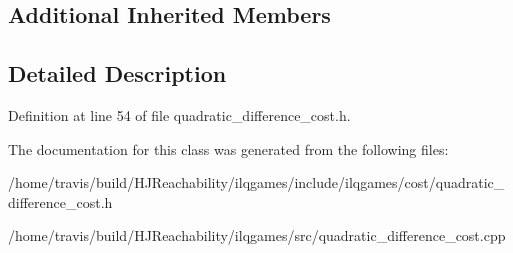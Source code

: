 \subsection*{Additional Inherited Members}


\subsection{Detailed Description}


Definition at line 54 of file quadratic\+\_\+difference\+\_\+cost.\+h.



The documentation for this class was generated from the following files\+:\begin{DoxyCompactItemize}
\item 
/home/travis/build/\+H\+J\+Reachability/ilqgames/include/ilqgames/cost/quadratic\+\_\+difference\+\_\+cost.\+h\item 
/home/travis/build/\+H\+J\+Reachability/ilqgames/src/quadratic\+\_\+difference\+\_\+cost.\+cpp\end{DoxyCompactItemize}
